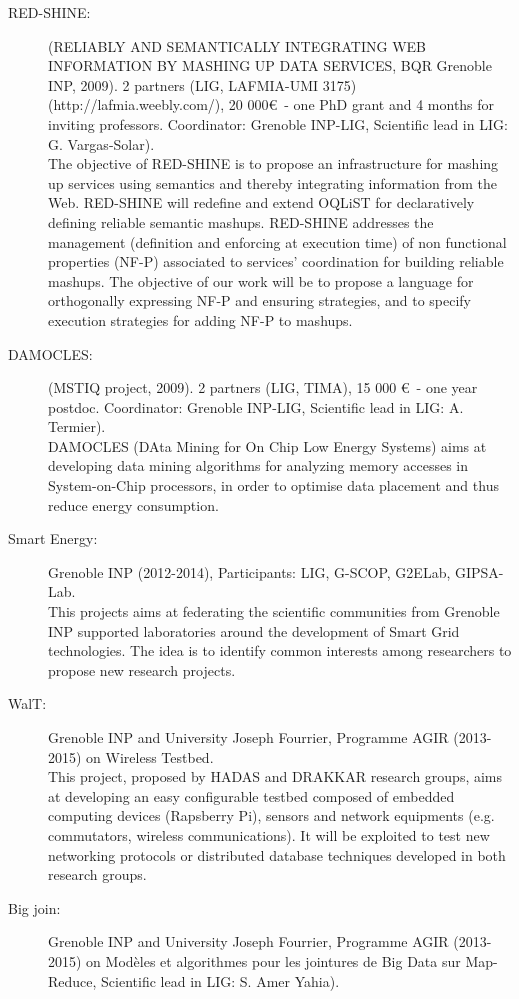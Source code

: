  \begin{description}

\item[RED-SHINE:] (RELIABLY AND SEMANTICALLY INTEGRATING WEB INFORMATION BY MASHING UP DATA SERVICES, BQR Grenoble INP, 2009). 2 partners (LIG, LAFMIA-UMI 3175)  (http://lafmia.weebly.com/), 20 000\euro\ - one PhD grant and 4 months for inviting professors. Coordinator: Grenoble INP-LIG, Scientific lead in LIG: G. Vargas-Solar). \\
The objective of RED-SHINE is to propose an infrastructure for mashing up services using semantics and thereby integrating information from the Web. RED-SHINE will redefine and extend OQLiST for declaratively defining reliable semantic mashups. RED-SHINE addresses the management (definition and enforcing at execution time) of non functional properties (NF-P) associated to services' coordination for building reliable mashups. The objective of our work will be to propose a language for orthogonally expressing NF-P and ensuring strategies, and to specify execution strategies for adding NF-P to mashups.

\item[DAMOCLES:] (MSTIQ project, 2009). 2 partners (LIG, TIMA), 15 000 \euro\ - one year postdoc. Coordinator: Grenoble INP-LIG, Scientific lead in LIG: A. Termier). \\
DAMOCLES (DAta Mining for On Chip Low Energy Systems) aims at developing data mining algorithms for analyzing memory accesses in System-on-Chip processors, in order to optimise data placement and thus reduce energy consumption.

\item[Smart Energy:] Grenoble INP (2012-2014), Participants: LIG, G-SCOP, G2ELab, GIPSA-Lab. \\
This projects aims at federating the scientific communities from Grenoble INP supported laboratories around the development of Smart Grid technologies.
The idea is to identify common interests among researchers to propose new research projects.

\item[WalT:] Grenoble INP and  University Joseph Fourrier, Programme AGIR (2013-2015) on Wireless Testbed. \\
This project, proposed by HADAS and DRAKKAR research groups, aims at developing an easy configurable testbed composed of embedded computing devices (Rapsberry Pi), sensors and network equipments (e.g. commutators, wireless communications). It will be exploited to test new networking protocols or distributed database techniques developed in both research groups.

\item[Big join:]  Grenoble INP and  University Joseph Fourrier, Programme AGIR (2013-2015) on Mod{\`e}les et algorithmes pour les jointures de Big Data sur Map-Reduce, Scientific lead in LIG: S. Amer Yahia). 

	
\end{description}

